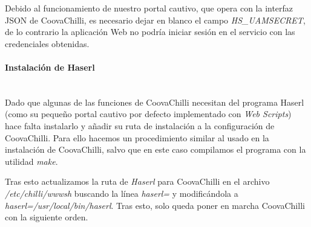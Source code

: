 
Debido al funcionamiento de nuestro portal cautivo, que opera con la interfaz JSON de CoovaChilli, es necesario dejar en blanco el campo \emph{HS\_UAMSECRET}, de lo contrario la aplicación Web no podría iniciar sesión en el servicio con las credenciales obtenidas.

\paragraph{Instalación de Haserl} \label{HaserlInstallTitle} ~\\

Dado que algunas de las funciones de CoovaChilli necesitan del programa Haserl (como su pequeño portal cautivo por defecto implementado con \emph{Web Scripts}) hace falta instalarlo y añadir su ruta de instalación a la configuración de CoovaChilli. Para ello hacemos un procedimiento similar al usado en la instalación de CoovaChilli, salvo que en este caso compilamos el programa con la utilidad \emph{make}.


Tras esto actualizamos la ruta de \emph{Haserl} para CoovaChilli en el archivo \emph{/etc/chilli/wwwsh} buscando la línea \emph{haserl=} y modificándola a \emph{haserl=/usr/local/bin/haserl}. Tras esto, solo queda poner en marcha CoovaChilli con la siguiente orden.

